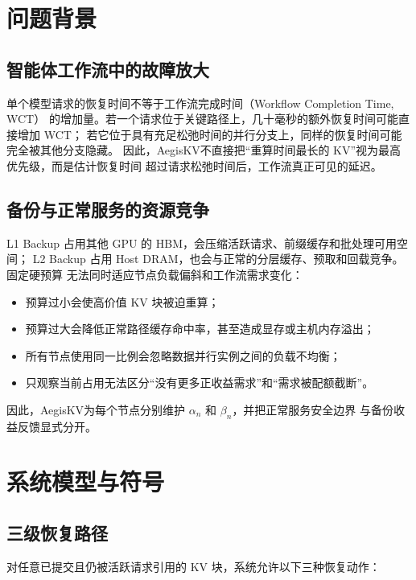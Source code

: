 \documentclass[UTF8,11pt,a4paper,fontset=fandol]{ctexart}
\newcommand{\AegisKV}{AegisKV}
\begin{document}
\section{问题背景}

\subsection{智能体工作流中的故障放大}

单个模型请求的恢复时间不等于工作流完成时间（Workflow Completion Time, WCT）
的增加量。若一个请求位于关键路径上，几十毫秒的额外恢复时间可能直接增加 WCT；
若它位于具有充足松弛时间的并行分支上，同样的恢复时间可能完全被其他分支隐藏。
因此，\AegisKV 不直接把“重算时间最长的 KV”视为最高优先级，而是估计恢复时间
超过请求松弛时间后，工作流真正可见的延迟。

\subsection{备份与正常服务的资源竞争}

L1 Backup 占用其他 GPU 的 HBM，会压缩活跃请求、前缀缓存和批处理可用空间；
L2 Backup 占用 Host DRAM，也会与正常的分层缓存、预取和回载竞争。固定硬预算
无法同时适应节点负载偏斜和工作流需求变化：

\begin{itemize}
  \item 预算过小会使高价值 KV 块被迫重算；
  \item 预算过大会降低正常路径缓存命中率，甚至造成显存或主机内存溢出；
  \item 所有节点使用同一比例会忽略数据并行实例之间的负载不均衡；
  \item 只观察当前占用无法区分“没有更多正收益需求”和“需求被配额截断”。
\end{itemize}

因此，\AegisKV 为每个节点分别维护 $\alpha_n$ 和 $\beta_n$，并把正常服务安全边界
与备份收益反馈显式分开。

\section{系统模型与符号}

\subsection{三级恢复路径}

对任意已提交且仍被活跃请求引用的 KV 块，系统允许以下三种恢复动作：
\end{document}
